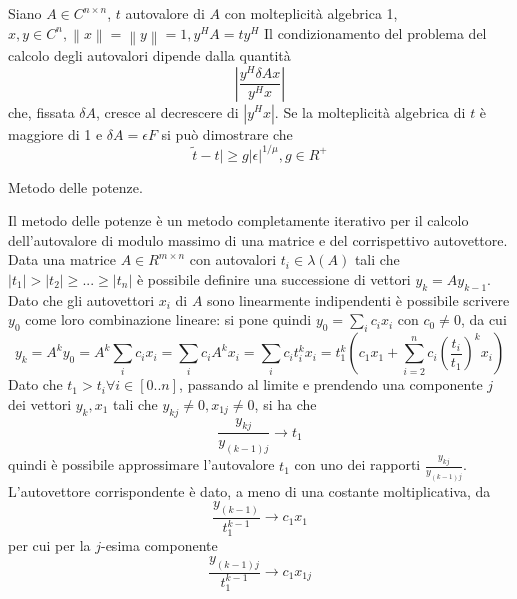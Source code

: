 \documentclass[answers, a4paper]{exam}
\newcommand{\norm}[1]{\left\lVert#1\right\rVert}
\begin{document}
\begin{questions}
\begin{solution}
		Siano $A \in C^{n \times n}$, $t$ autovalore di $A$ con molteplicità algebrica 1, $x, y \in C^n, \norm{x} = \norm{y} = 1, y^H A = t y^H$
		Il condizionamento del problema del calcolo degli autovalori dipende dalla quantità 
		\begin{equation}
			|\frac{y^H \delta A x}{y^H x}|
		\end{equation}
		che, fissata $\delta A$, cresce al decrescere di $|y^H x|$.
		Se la molteplicità algebrica di $t$ è maggiore di 1 e $\delta A = \epsilon F$ si può dimostrare che 
		\begin{equation}
			\tilde{t} - t| \geq g |\epsilon|^{1/\mu}, g \in R^+
		\end{equation}

	\end{solution}
	\question Metodo delle potenze.
	\begin{solution}
		Il metodo delle potenze è un metodo completamente iterativo per il calcolo dell'autovalore di modulo massimo di una matrice e del corrispettivo autovettore. 
		Data una matrice $A \in R^{m \times n}$ con autovalori $t_i \in \lambda(A)$ tali che $|t_1| > |t_2| \geq ... \geq |t_n|$ è possibile definire una successione di vettori $y_k = A y_{k - 1}$.
		Dato che gli autovettori $x_i$ di $A$ sono linearmente indipendenti è possibile scrivere $y_0$ come loro combinazione lineare: si pone quindi $y_0 = \sum_i c_i x_i$ con $c_0 \neq 0$, da cui 
		$$
		y_k = A^k y_0 
		= A^k \sum_i c_i x_i 
		= \sum_i c_i A^k x_i
		= \sum_i c_i t_i^k x_i
		= t_1^k (c_1 x_1 + \sum_{i = 2}^{n} c_i (\frac{t_i}{t_1})^k x_i)
		$$
		Dato che $t_1 > t_i \forall i \in [0..n]$, passando al limite e prendendo una componente $j$ dei vettori $y_k, x_1$ tali che $y_{kj} \neq 0, x_{1j} \neq 0$, si ha che 
		\begin{equation}
			\label{eqn:powermethod_value}
			\frac{y_{kj}}{y_{(k - 1)j}} \longrightarrow t_1
		\end{equation}
		quindi è possibile approssimare l'autovalore $t_1$ con uno dei rapporti $\frac{y_{kj}}{y_{(k - 1)j}}$.
		L'autovettore corrispondente è dato, a meno di una costante moltiplicativa, da \begin{equation}
			\label{eqn:powermethod_vec}
			\frac{y_{(k - 1)}}{t_1^{k - 1}} \longrightarrow c_1 x_1
		\end{equation}
		per cui per la $j$-esima componente 
		\begin{equation}
			\label{eqn:powermethod_vec_lim}
			\frac{y_{{(k - 1)}j}}{t_1^{k - 1}} \longrightarrow c_1 x_{1j}
		\end{equation}

\end{solution}
\end{questions}
\end{document}

